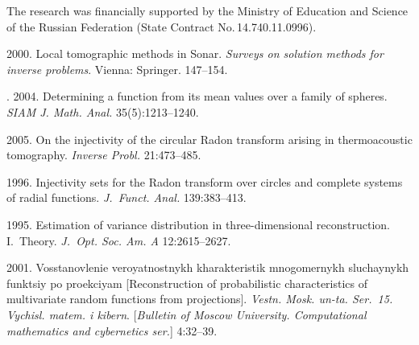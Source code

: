 

\Ack
\noindent
The research was financially supported by the Ministry of Education
and Science of the Russian Federation (State Contract No.\,14.740.11.0996).


  \begin{multicols}{2}

\renewcommand{\bibname}{\protect\rmfamily References}

{\small\frenchspacing
{%
\begin{thebibliography}{99}

 2000.
Local tomographic methods in Sonar. \textit{Surveys on solution methods for inverse problems}.
Vienna: Springer. 147--154.



. 2004. Determining a function from
its mean values over a family of spheres. \textit{SIAM J. Math. Anal.}
35(5):1213--1240.

2005. On the injectivity of the circular Radon transform arising in thermoacoustic 
tomography. \textit{Inverse Probl.} 21:473--485.




 1996.
Injectivity sets for the Radon transform over circles and complete 
systems of radial functions. \textit{J.~Funct. Anal.} 139:383--413.

 1995. 
Estimation of variance distribution in three-dimensional reconstruction. I.~Theory.
\textit{J.~Opt. Soc. Am. A} 12:2615--2627.

2001.
Vosstanovlenie veroyatnostnykh kharakteristik mnogomernykh slu\-chay\-nykh funktsiy po 
proekciyam 
[Reconstruction of probabilistic characteristics of multivariate random functions from 
projections]. \textit{Vestn. Mosk. un-ta. Ser.~15. Vychisl. matem. i kibern}. 
[\textit{Bulletin of Moscow University. Computational mathematics and cybernetics
ser.}] 4:32--39.



\end{thebibliography}}}
\end{multicols}
